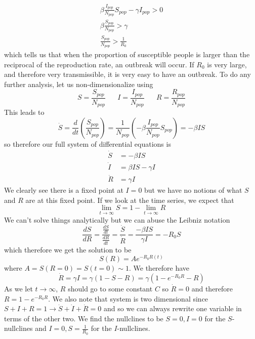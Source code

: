\documentclass{article}
\newcommand{\od}[2]{\frac{d #1}{d #2}}
\newcommand{\twen}{\hspace{20pt}}
\begin{document}
\begin{equation*}
    \begin{split}
        \beta \frac{I_{pop}}{N_{pop}} S_{pop} - \gamma I_{pop} > 0  \\
        \beta \frac{S_{pop}}{N_{pop}} > \gamma \\
        \frac{S_{pop}}{N_{pop}}>\frac{1}{R_0}
    \end{split}
\end{equation*}
which tells us that when the proportion of susceptible people is larger than the reciprocal of the reproduction rate, an outbreak will occur. If $R_0$ is very large, and therefore very transmissible, it is very easy to have an outbreak. To do any further analysis, let us non-dimensionalize using 
\begin{equation*}
    S= \frac{S_{pop}}{N_{pop}} \twen I=\frac{I_{pop}}{N_{pop}} \twen R= \frac{R_{pop}}{N_{pop}}
\end{equation*}
This leads to 
\begin{equation*}
    \dot S= \od{}{t} \left( \frac{S_{pop}}{N_{pop}} \right) = \frac{1}{N_{pop}} \left( -\beta \frac{I_{pop}}{N_{pop}} S_{pop} \right)= -\beta IS
\end{equation*}
so therefore our full system of differential equations is 
\begin{equation*}
    \begin{split}
        \dot S &= -\beta IS \\
        \dot I &= \beta I S - \gamma I \\
        \dot R &= \gamma I
    \end{split}
\end{equation*}
We clearly see there is a fixed point at $I=0$ but we have no notions of what $S$ and $R$ are at this fixed point. If we look at the time series, we expect that 
\begin{equation*}
    \lim_{t \rightarrow \infty} S = 1- \lim_{t\rightarrow \infty} R
\end{equation*}
We can't solve things analytically but we can abuse the Leibniz notation 
\begin{equation*}
    \od{S}{R} = \frac{\od{S}{t}}{\od{R}{t}} = \frac{\dot S}{\dot R} = \frac{-\beta I S}{\gamma I} = -R_0 S
\end{equation*}
which therefore we get the solution to be 
\begin{equation*}
    S(R) = Ae^{-R_0 R(t)}
\end{equation*}
where $A = S(R=0) = S(t=0) \sim 1$. We therefore have 
\begin{equation*}
    \dot R = \gamma I = \gamma (1-S-R) = \gamma (1 -e^{-R_0 R} -R)
\end{equation*}
As we let $t\rightarrow \infty$, $R$ should go to some constant $C$ so $\dot R=0$ and therefore $R=1-e^{-R_0R}$. We also note that system is two dimensional since $S+I+R=1 \to \dot S+\dot I+\dot R =0$ and so we can always rewrite one variable in terms of the other two. We find the nullclines to be $S=0,I=0$ for the $S$-nullclines and $I=0, S=\frac{1}{R_0}$ for the $I$-nullclines.
\end{document}
